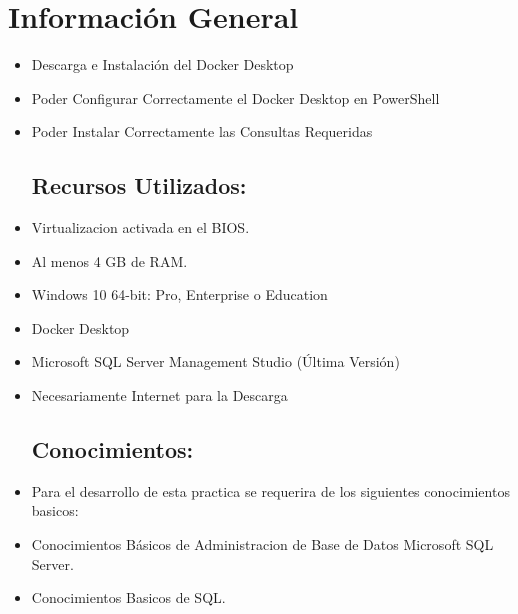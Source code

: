 \section{Información General}

	\begin{itemize}
		\subsection{Objetivos:}
			\item Descarga e Instalación del Docker Desktop
			 \item Poder Configurar Correctamente el Docker Desktop en PowerShell
			 \item Poder Instalar Correctamente las Consultas Requeridas
		\subsection{Recursos Utilizados:}
			\item Virtualizacion activada en el BIOS.
			\item Al menos 4 GB de RAM.
			\item Windows 10 64-bit: Pro, Enterprise o Education
			\item Docker Desktop
			\item Microsoft SQL Server Management Studio (Última Versión)
			\item Necesariamente Internet para la Descarga
		\subsection{Conocimientos:}
			\item Para el desarrollo de esta practica se requerira de los siguientes conocimientos basicos:
			\item Conocimientos Básicos de Administracion de Base de Datos Microsoft SQL Server.
			\item Conocimientos Basicos de SQL.
	\end{itemize}